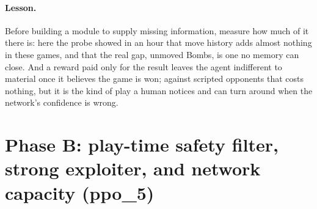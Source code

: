 \paragraph{Lesson.} Before building a module to supply missing information, measure how much of it
there is: here the probe showed in an hour that move history adds almost nothing in these games,
and that the real gap, unmoved Bombs, is one no memory can close. And a reward paid only for the
result leaves the agent indifferent to material once it believes the game is won; against
scripted opponents that costs nothing, but it is the kind of play a human notices and can turn
around when the network's confidence is wrong.

\section{Phase B: play-time safety filter, strong exploiter, and network capacity (ppo\_5)}
\label{sec:phase-b}

